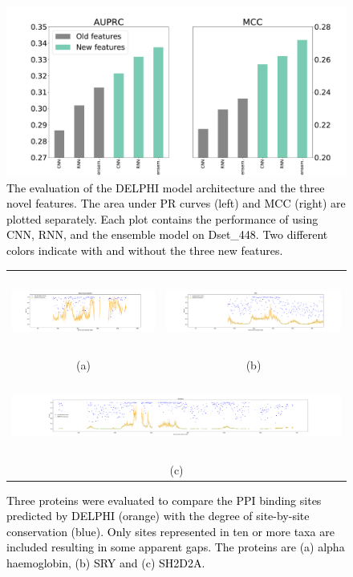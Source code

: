 \documentclass{bioinfo}
\newcommand{\myColor}{black}
\newcommand{\mySecondColor}{black}
\begin{document}
\begin{figure}
\centering
\includegraphics[width=\columnwidth]{CNN_RNN_ensemble.pdf}
  \caption{\textcolor{\myColor}{{The evaluation of the DELPHI model architecture and the three novel features.} The area under PR curves (left) and MCC (right) are plotted separately. Each plot contains the performance of using CNN, RNN, and the ensemble model on Dset\_448. Two different colors indicate with and without the three new features.}
  \label{fig_CNN_RNN_ensemble}}
\end{figure}


\begin{figure}
\centering
\begin{tabular}{cc}
\includegraphics[height=2.55cm]{hemoglobin_top178_conservation.pdf} & 
\includegraphics[height=2.55cm]{SRY_conservation.pdf}\\
\small (a) & \small (b)\\
\multicolumn{2}{c}{\includegraphics[height=2.55cm]{SH2_conservation.pdf}}\\
\multicolumn{2}{c}{\small (c)}
\end{tabular}
  \caption{\textcolor{\mySecondColor}{Three proteins were evaluated to compare the PPI binding sites predicted by DELPHI (orange) with the degree of site-by-site conservation (blue).  Only sites represented in ten or more taxa are included resulting in some apparent gaps.  The proteins are (a) alpha haemoglobin, (b) SRY and (c) SH2D2A.} 
  \label{fig_conservation_vs_sitePred}}
\end{figure}
\end{document}
